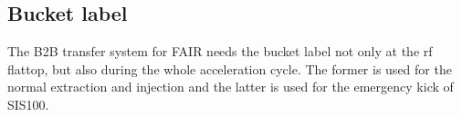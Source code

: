 







\subsection{Bucket label}
The B2B transfer system for FAIR needs the bucket label not only at the rf flattop, but also during the whole acceleration cycle. The former is used for the normal extraction and injection and the latter is used for the emergency kick of SIS100. 


